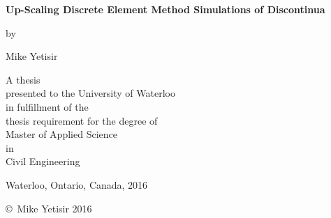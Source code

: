 \pagestyle{empty}

\begin{titlepage}
        \begin{center}
        \vspace*{1.0cm}

        \Huge
        {\bf Up-Scaling Discrete Element Method Simulations of Discontinua}

        \vspace*{1.0cm}

        \normalsize
        by \\

        \vspace*{1.0cm}

        \Large
        Mike Yetisir \\

        \vspace*{3.0cm}

        \normalsize
        A thesis \\
        presented to the University of Waterloo \\ 
        in fulfillment of the \\
        thesis requirement for the degree of \\
        Master of Applied Science \\
        in \\
        Civil Engineering \\

        \vspace*{2.0cm}

        Waterloo, Ontario, Canada, 2016 \\

        \vspace*{1.0cm}

        \copyright\ Mike Yetisir 2016 \\
        \end{center}
\end{titlepage}

\pagestyle{plain}
\setcounter{page}{2}

